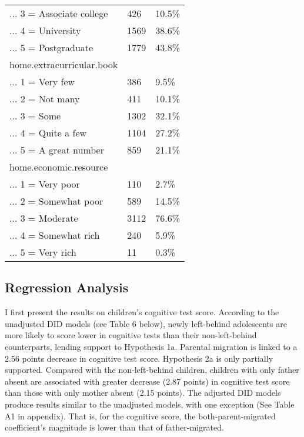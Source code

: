 \documentclass[
  man,floatsintext]{apa7}
\begin{document}
\begin{table}
\begin{tabular}[t]{lll}
... 3 = Associate college & 426 & 10.5\%\\
... 4 = University & 1569 & 38.6\%\\
... 5 = Postgraduate & 1779 & 43.8\%\\
home.extracurricular.book &  & \\
... 1 = Very few & 386 & 9.5\%\\
... 2 = Not many & 411 & 10.1\%\\
... 3 = Some & 1302 & 32.1\%\\
... 4 = Quite a few & 1104 & 27.2\%\\
... 5 = A great number & 859 & 21.1\%\\
home.economic.resource &  & \\
... 1 = Very poor & 110 & 2.7\%\\
... 2 = Somewhat poor & 589 & 14.5\%\\
... 3 = Moderate & 3112 & 76.6\%\\
... 4 = Somewhat rich & 240 & 5.9\%\\
... 5 = Very rich & 11 & 0.3\%\\
\bottomrule
\end{tabular}
\end{table}

\newpage

\hypertarget{regression-analysis}{%
\subsection{Regression Analysis}\label{regression-analysis}}

I first present the results on children's cognitive test score. According to the unadjusted DID models (see Table 6 below), newly left-behind adolescents are more likely to score lower in cognitive tests than their non-left-behind counterparts, lending support to Hypothesis 1a. Parental migration is linked to a 2.56 points decrease in cognitive test score. Hypothesis 2a is only partially supported. Compared with the non-left-behind children, children with only father absent are associated with greater decrease (2.87 points) in cognitive test score than those with only mother absent (2.15 points). The adjusted DID models produce results similar to the unadjusted models, with one exception (See Table A1 in appendix). That is, for the cognitive score, the both-parent-migrated coefficient's magnitude is lower than that of father-migrated.
\end{document}
